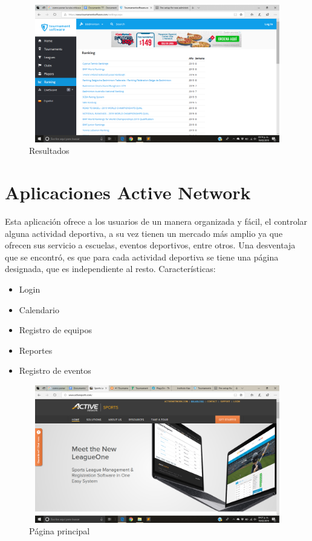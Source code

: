 	\pagebreak
	\begin{figure}[h]
		\centering
		\includegraphics[width=12cm, height=6cm]{Imagenes/Aplicaciones/Tos3.png}
		\caption{Resultados}
	\end{figure}
	
	\section{Aplicaciones Active Network}
	Esta aplicación ofrece a los usuarios de un manera organizada y fácil, el controlar alguna actividad deportiva, a su vez tienen un mercado más amplio ya que ofrecen sus servicio a escuelas, eventos deportivos, entre otros. Una desventaja que se encontró, es que para cada actividad deportiva se tiene una página designada, que es independiente al resto.
	Características: 
	\begin{itemize}
		\item Login
		\item Calendario
		\item Registro de equipos
		\item Reportes
		\item Registro de eventos
	\end{itemize}
	\begin{figure}[ht]
		\centering
		\includegraphics[width=12cm, height=6cm]{Imagenes/Aplicaciones/AN1.png}
		\caption{Página principal}
	\end{figure}
	
